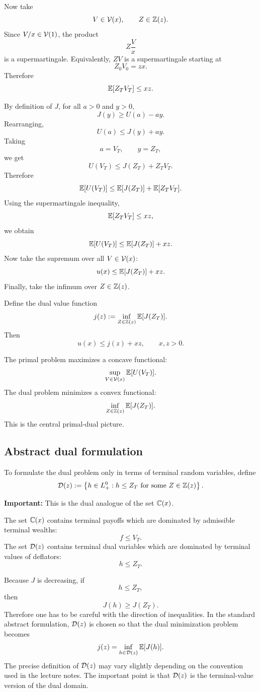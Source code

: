 Now take
\[
    V\in\mathcal{V}(x),
    \qquad
    Z\in\mathbb{Z}(z).
\]
Since $V/x\in\mathcal{V}(1)$, the product
\[
    Z\frac{V}{x}
\]
is a supermartingale. Equivalently, $ZV$ is a supermartingale starting at
\[
    Z_0V_0=zx.
\]
Therefore
\[
    \mathbb{E}[Z_TV_T]\leq xz.
\]

By definition of $J$, for all $a>0$ and $y>0$,
\[
    J(y)\geq U(a)-ay.
\]
Rearranging,
\[
    U(a)\leq J(y)+ay.
\]
Taking
\[
    a=V_T,
    \qquad
    y=Z_T,
\]
we get
\[
    U(V_T)
    \leq
    J(Z_T)+Z_TV_T.
\]
Therefore
\[
    \mathbb{E}[U(V_T)]
    \leq
    \mathbb{E}[J(Z_T)]
    +
    \mathbb{E}[Z_TV_T].
\]
Using the supermartingale inequality,
\[
    \mathbb{E}[Z_TV_T]\leq xz,
\]
we obtain
\[
    \mathbb{E}[U(V_T)]
    \leq
    \mathbb{E}[J(Z_T)]
    +
    xz.
\]
Now take the supremum over all $V\in\mathcal{V}(x)$:
\[
    u(x)
    \leq
    \mathbb{E}[J(Z_T)]
    +
    xz.
\]
Finally, take the infimum over $Z\in\mathbb{Z}(z)$.

\begin{definicija}
Define the dual value function
\[
    j(z)
    :=
    \inf_{Z\in\mathbb{Z}(z)}
    \mathbb{E}[J(Z_T)].
\]
Then
\[
    u(x)
    \leq
    j(z)+xz,
    \qquad x,z>0.
\]
\end{definicija}

\begin{opomba}
The primal problem maximizes a concave functional:
\[
    \sup_{V\in\mathcal{V}(x)}\mathbb{E}[U(V_T)].
\]
The dual problem minimizes a convex functional:
\[
    \inf_{Z\in\mathbb{Z}(z)}\mathbb{E}[J(Z_T)].
\]
This is the central primal-dual picture.
\end{opomba}

\subsection{Abstract dual formulation}

To formulate the dual problem only in terms of terminal random variables, define
\[
    \mathcal{D}(z)
    :=
    \left\{
        h\in L_+^0:
        h\leq Z_T
        \text{ for some } Z\in\mathbb{Z}(z)
    \right\}.
\]

\textbf{\color{red}Important:} This is the dual analogue of the set $\mathbb{C}(x)$.

The set $\mathbb{C}(x)$ contains terminal payoffs which are dominated by admissible terminal wealths:
\[
    f\leq V_T.
\]
The set $\mathcal{D}(z)$ contains terminal dual variables which are dominated by terminal values of deflators:
\[
    h\leq Z_T.
\]

Because $J$ is decreasing, if
\[
    h\leq Z_T,
\]
then
\[
    J(h)\geq J(Z_T).
\]
Therefore one has to be careful with the direction of inequalities. In the standard abstract formulation, $\mathcal{D}(z)$ is chosen so that the dual minimization problem becomes
\[
    j(z)
    =
    \inf_{h\in\mathcal{D}(z)}
    \mathbb{E}[J(h)].
\]
The precise definition of $\mathcal{D}(z)$ may vary slightly depending on the convention used in the lecture notes. The important point is that $\mathcal{D}(z)$ is the terminal-value version of the dual domain.

